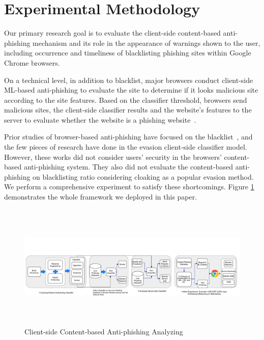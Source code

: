 
\section{Experimental Methodology}
\label{s:methodology}

Our primary research goal is to evaluate the client-side content-based anti-phishing mechanism and its role in the appearance of warnings shown to the user, including occurrence and timeliness of blacklisting phishing sites within Google Chrome browsers.

On a technical level, in addition to blacklist, major browsers conduct client-side ML-based anti-phishing to evaluate the site to determine if it looks malicious site according to the site features. Based on the classifier threshold, browsers send malicious sites, the client-side classifier results and the website's features to the server to evaluate whether the website is a phishing website~\cite{google-online-security-blog-2019}.

Prior studies of browser-based anti-phishing have focused on the blacklist~\cite{oest2019phishfarm,han2016phisheye,sheng2009empirical}, and the few pieces of research have done in the evasion client-side classifier model. However, these works did not consider users' security in the browsers' content-based anti-phishing system. They also did not evaluate the content-based anti-phishing on blacklisting ratio considering cloaking as a popular evasion method. We perform a comprehensive experiment to satisfy these shortcomings. Figure \ref{ frame work} demonstrates the whole framework we deployed in this paper.
\begin{figure}[h]
  \includegraphics[width=\textwidth,height=6cm]{Untitled Diagram (3).pdf}
  \caption{ Client-side Content-based Anti-phishing Analyzing}
  \label{ frame work}
\end{figure}

